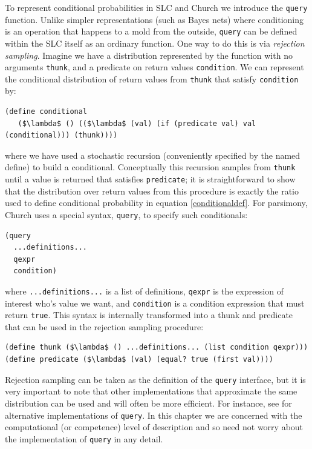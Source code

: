 \documentclass[pdfextras]{handbook}
\begin{document}
To represent conditional probabilities in SLC and Church we introduce the \lstinline{query} function. Unlike simpler representations (such as Bayes nets) where conditioning is an operation that happens to a mold from the outside, \lstinline{query} can be defined within the SLC itself as an ordinary function. One way to do this is via \emph{rejection sampling}. Imagine we have a distribution represented by the function with no arguments \lstinline{thunk}, and a predicate on return values \lstinline{condition}. We can represent the conditional distribution of return values from \lstinline{thunk} that satisfy \lstinline{condition} by:
\begin{lstlisting}[mathescape]
(define conditional 
   ($\lambda$ () (($\lambda$ (val) (if (predicate val) val (conditional))) (thunk))))
\end{lstlisting}
where we have used a stochastic recursion (conveniently specified by the named define) to build a conditional. 
Conceptually this recursion samples from \lstinline{thunk} until a value is returned that satisfies \lstinline{predicate}; it is straightforward to show that the distribution over return values from this procedure is exactly the ratio used to define conditional probability in equation \ref{conditionaldef}.
For parsimony, Church uses a special syntax, \lstinline{query}, to specify such conditionals: 
\begin{lstlisting}[mathescape]
(query
  ...definitions...
  qexpr
  condition)
\end{lstlisting}
where \lstinline{...definitions...} is a list of definitions, \lstinline{qexpr} is the expression of interest who's value we want, and \lstinline{condition} is a condition expression that must return \lstinline{true}. 
This syntax is internally transformed into a thunk and predicate that can be used in the rejection sampling procedure:
\begin{lstlisting}[mathescape]
(define thunk ($\lambda$ () ...definitions... (list condition qexpr)))
(define predicate ($\lambda$ (val) (equal? true (first val))))
\end{lstlisting}
Rejection sampling can be taken as the definition of the \lstinline{query} interface, but it is very important to note that other implementations that approximate the same distribution can be used and will often be more efficient. For instance, see \cite{wingate2011lightweight} for alternative implementations of \lstinline{query}. In this chapter we are concerned with the computational (or competence) level of description and so need not worry about the implementation of \lstinline{query} in any detail.
\end{document}
